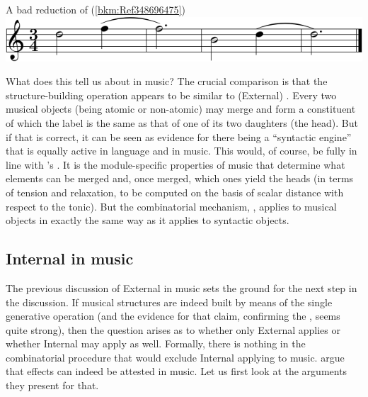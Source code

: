\documentclass[output=paper]{langsci/langscibook}
\begin{document}
\ea\label{ex:key:26.9}A bad reduction of
(\ref{bkm:Ref348696475})\\[.66\baselineskip]
    \includegraphics[scale=.9]{./img/28-9.pdf}
\z

What does this tell us about  in music? The crucial comparison is
that the structure-building operation appears to be similar to (External)
. Every two musical objects (being atomic or non-atomic) may merge
and form a constituent of which the label is the same as that of one of its two
daughters (the head). But if that is correct, it can be seen as evidence for
there being a \enquote{syntactic engine} that is equally active in language and in
music. This would, of course, be fully in line with \citeauthor{KatzPes2011}’s
. It is the module-specific
properties of music that determine what elements can be merged and, once
merged, which ones yield the heads (in terms of tension and relaxation, to be
computed on the basis of scalar distance with respect to the tonic). But the
combinatorial mechanism, , applies to musical objects in exactly the same
way as it applies to syntactic objects.

\subsection{Internal  in music}\label{sec:key:26.3.3}

The previous discussion of External  in music sets the ground for
the next step in the discussion. If musical structures are indeed built by
means of the single generative operation  (and the evidence for that
claim, confirming the , seems quite
strong), then the question arises as to whether only External 
applies or whether Internal  may apply as well. Formally, there is nothing
in the combinatorial procedure that would exclude Internal  applying
to music. \citeauthor{KatzPes2011} argue that  effects can indeed
be attested in music. Let us first look at the arguments they present for that.
\end{document}
